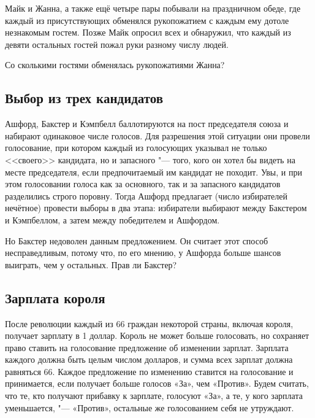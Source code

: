 \documentclass[twoside]{book}
\makeatletter
\newcommand{\rindex}[2][\imki@jobname]{%
\index[#1]{\detokenize{#2}}%
}
\makeatother
\begin{document}
Майк и Жанна, а также ещё четыре пары побывали на праздничном обеде, где каждый из присутствующих обменялся рукопожатием с каждым ему дотоле незнакомым гостем.
Позже Майк опросил всех и обнаружил, что каждый из девяти остальных гостей пожал руки разному числу людей.

Со сколькими гостями обменялась рукопожатиями Жанна?

\subsection*{Выбор из трех кандидатов}%
\rindex{Выбор из трех кандидатов}

Ашфорд, Бакстер и Кэмпбелл баллотируются на пост председателя союза %
и набирают одинаковое числе голосов.
Для разрешения этой ситуации они провели голосование, при котором каждый из голосующих указывал не только <<своего>> кандидата, но и запасного "--- того, кого он хотел бы видеть на месте председателя, если предпочитаемый им кандидат не походит. Увы, и при этом голосовании голоса как за основного, так и за запасного кандидатов разделились строго поровну.
Тогда Ашфорд предлагает (число избирателей нечётное) провести выборы в два этапа: избиратели выбирают между Бакстером и Кэмпбеллом, а затем между победителем и Ашфордом.


Но Бакстер недоволен данным предложением.
Он считает этот способ несправедливым, потому что, по его мнению, у Ашфорда больше шансов выиграть, чем у остальных.
Прав ли Бакстер?

\subsection*{Зарплата короля}%
\rindex{Зарплата короля}

После революции каждый из 66 граждан некоторой страны, включая короля, получает зарплату в 1 доллар.
Король не может больше голосовать, но сохраняет право ставить на голосование предложение об изменении зарплат.
Зарплата каждого должна быть целым числом долларов, и сумма
всех зарплат должна равняться 66.
Каждое предложение по изменению ставится на голосование и принимается, если получает больше голосов «За», чем «Против».
Будем считать, что те, кто получают прибавку к зарплате, голосуют «За», а те, у кого зарплата уменьшается, "--- «Против», остальные же голосованием себя не утруждают.
\end{document}
